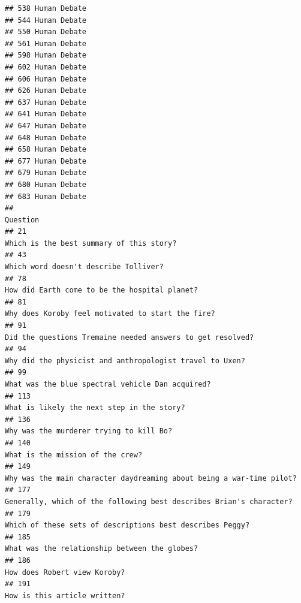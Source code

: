 \documentclass[
]{article}
\begin{document}
\begin{verbatim}
## 538 Human Debate
## 544 Human Debate
## 550 Human Debate
## 561 Human Debate
## 598 Human Debate
## 602 Human Debate
## 606 Human Debate
## 626 Human Debate
## 637 Human Debate
## 641 Human Debate
## 647 Human Debate
## 648 Human Debate
## 658 Human Debate
## 677 Human Debate
## 679 Human Debate
## 680 Human Debate
## 683 Human Debate
##                                                                                                                              Question
## 21                                                                                           Which is the best summary of this story?
## 43                                                                                              Which word doesn't describe Tolliver?
## 78                                                                                      How did Earth come to be the hospital planet?
## 81                                                                                  Why does Koroby feel motivated to start the fire?
## 91                                                                         Did the questions Tremaine needed answers to get resolved?
## 94                                                                           Why did the physicist and anthropologist travel to Uxen?
## 99                                                                                   What was the blue spectral vehicle Dan acquired?
## 113                                                                                        What is likely the next step in the story?
## 136                                                                                           Why was the murderer trying to kill Bo?
## 140                                                                                                  What is the mission of the crew?
## 149                                                              Why was the main character daydreaming about being a war-time pilot?
## 177                                                              Generally, which of the following best describes Brian's character? 
## 179                                                                         Which of these sets of descriptions best describes Peggy?
## 185                                                                                     What was the relationship between the globes?
## 186                                                                                                      How does Robert view Koroby?
## 191                                                                                                      How is this article written?

\end{verbatim}
\end{document}
